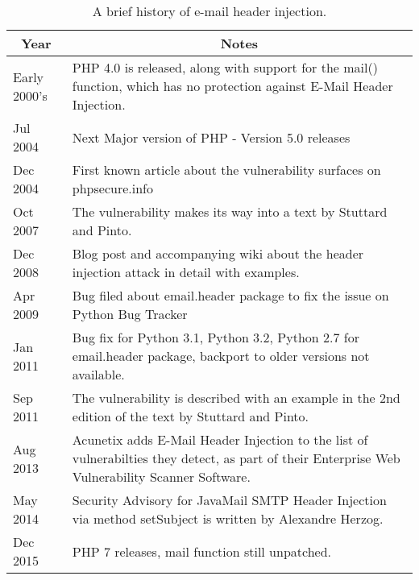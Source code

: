 \begin{table}[tbp]
	\centering
	\begin{tabular}{|p{2cm}|p{12cm}|}
		\hline
		\multicolumn{1}{|c|}{\textbf{Year}} & \multicolumn{1}{c|}{\textbf{ Notes}}\\
		\hline

		{Early 2000's } & { PHP 4.0 is released, along with support for the mail() function, which has no protection against E-Mail Header Injection.}\\
		\hline

		{Jul 2004} & { Next Major version of PHP - Version 5.0 releases}\\
		\hline

		{Dec 2004} & { First known article about the vulnerability surfaces on phpsecure.info}\\
		\hline

		{Oct 2007} & {The vulnerability makes its way into a text by Stuttard and Pinto. }\\
		\hline

		{Dec 2008} & {Blog post and accompanying wiki about the header injection attack in detail with examples.}\\
		\hline

		{Apr 2009} & {Bug filed about email.header package to fix the issue on Python Bug Tracker}\\
		\hline

		{Jan 2011} & {Bug fix for Python 3.1, Python 3.2, Python 2.7 for email.header package, backport to older versions not available.}\\
		\hline

		{Sep 2011} & {The vulnerability is described with an example in the 2nd edition of the text by Stuttard and Pinto.}\\
		\hline

		{Aug 2013} & {Acunetix adds E-Mail Header Injection to the list of vulnerabilties they detect, as part of their Enterprise Web Vulnerability Scanner Software.}\\
		\hline

		{May 2014} & {Security Advisory for JavaMail SMTP Header Injection via method setSubject is written by Alexandre Herzog.}\\
		\hline

		{Dec 2015}  & {PHP 7 releases, mail function still unpatched.}\\
		\hline
	\end{tabular}
	\caption[]{A brief history of e-mail header injection.}
	\label{tab:history}
\end{table}
